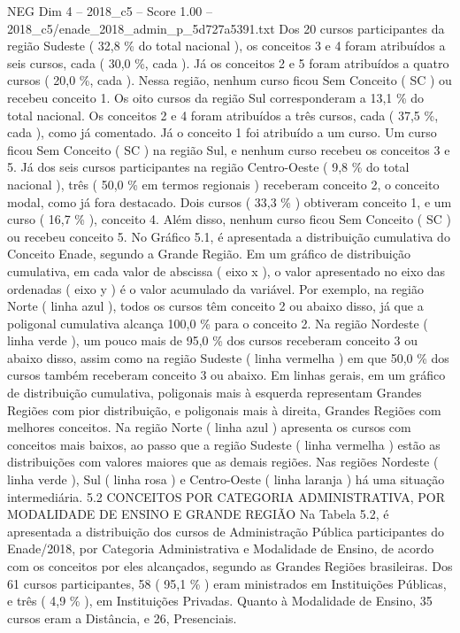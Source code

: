 \begin{textsample}{NEG Dim 4 – 2018\_c5 – Score 1.00 – 2018\_c5/enade\_2018\_admin\_p\_5d727a5391.txt}
Dos 20 cursos participantes da região Sudeste ( 32,8 \% do total nacional ), os conceitos 3 e 4 foram atribuídos a seis cursos, cada ( 30,0 \%, cada ).
Já os conceitos 2 e 5 foram atribuídos a quatro cursos ( 20,0 \%, cada ).
Nessa região, nenhum curso ficou Sem Conceito ( SC ) ou recebeu conceito 1.
Os oito cursos da região Sul corresponderam a 13,1 \% do total nacional.
Os conceitos 2 e 4 foram atribuídos a três cursos, cada ( 37,5 \%, cada ), como já comentado.
Já o conceito 1 foi atribuído a um curso.
Um curso ficou Sem Conceito ( SC ) na região Sul, e nenhum curso recebeu os conceitos 3 e 5.
Já dos seis cursos participantes na região Centro-Oeste ( 9,8 \% do total nacional ), três ( 50,0 \% em termos regionais ) receberam conceito 2, o conceito modal, como já fora destacado.
Dois cursos ( 33,3 \% ) obtiveram conceito 1, e um curso ( 16,7 \% ), conceito 4.
Além disso, nenhum curso ficou Sem Conceito ( SC ) ou recebeu conceito 5.
No Gráfico 5.1, é apresentada a distribuição cumulativa do Conceito Enade, segundo a Grande Região.
Em um gráfico de distribuição cumulativa, em cada valor de abscissa ( eixo x ), o valor apresentado no eixo das ordenadas ( eixo y ) é o valor acumulado da variável.
Por exemplo, na região Norte ( linha azul ), todos os cursos têm conceito 2 ou abaixo disso, já que a poligonal cumulativa alcança 100,0 \% para o conceito 2.
Na região Nordeste ( linha verde ), um pouco mais de 95,0 \% dos cursos receberam conceito 3 ou abaixo disso, assim como na região Sudeste ( linha vermelha ) em que 50,0 \% dos cursos também receberam conceito 3 ou abaixo.
Em linhas gerais, em um gráfico de distribuição cumulativa, poligonais mais à esquerda representam Grandes Regiões com pior distribuição, e poligonais mais à direita, Grandes Regiões com melhores conceitos.
Na região Norte ( linha azul ) apresenta os cursos com conceitos mais baixos, ao passo que a região Sudeste ( linha vermelha ) estão as distribuições com valores maiores que as demais regiões.
Nas regiões Nordeste ( linha verde ), Sul ( linha rosa ) e Centro-Oeste ( linha laranja ) há uma situação intermediária. 5.2 CONCEITOS POR CATEGORIA ADMINISTRATIVA, POR MODALIDADE DE ENSINO E GRANDE REGIÃO Na Tabela 5.2, é apresentada a distribuição dos cursos de Administração Pública participantes do Enade/2018, por Categoria Administrativa e Modalidade de Ensino, de acordo com os conceitos por eles alcançados, segundo as Grandes Regiões brasileiras.
Dos 61 cursos participantes, 58 ( 95,1 \% ) eram ministrados em Instituições Públicas, e três ( 4,9 \% ), em Instituições Privadas.
Quanto à Modalidade de Ensino, 35 cursos eram a Distância, e 26, Presenciais.

\end{textsample}
